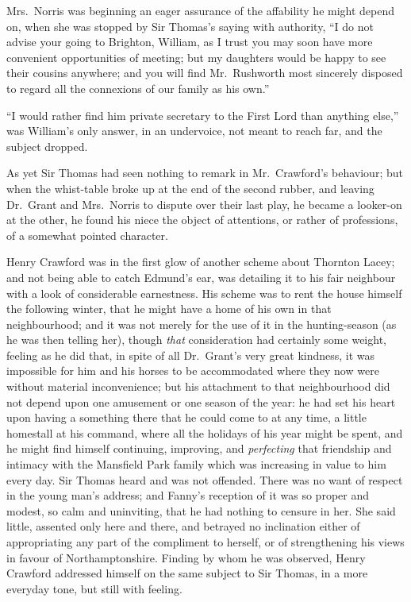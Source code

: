 \documentclass{article}
\begin{document}
Mrs.\ Norris was beginning an eager assurance of the
affability he might depend on, when she was stopped
by Sir Thomas's saying with authority, ``I do not advise
your going to Brighton, William, as I trust you may soon
have more convenient opportunities of meeting; but my
daughters would be happy to see their cousins anywhere;
and you will find Mr.\ Rushworth most sincerely disposed
to regard all the connexions of our family as his own.''

``I would rather find him private secretary to the First
Lord than anything else,'' was William's only answer,
in an undervoice, not meant to reach far, and the
subject dropped.

As yet Sir Thomas had seen nothing to remark in Mr.\ Crawford's
behaviour; but when the whist-table broke up at the end
of the second rubber, and leaving Dr.\ Grant and Mrs.\ Norris
to dispute over their last play, he became a looker-on
at the other, he found his niece the object of attentions,
or rather of professions, of a somewhat pointed character.

Henry Crawford was in the first glow of another scheme
about Thornton Lacey; and not being able to catch
Edmund's ear, was detailing it to his fair neighbour
with a look of considerable earnestness.  His scheme
was to rent the house himself the following winter,
that he might have a home of his own in that neighbourhood;
and it was not merely for the use of it in the hunting-season
(as he was then telling her), though \emph{that} consideration
had certainly some weight, feeling as he did that,
in spite of all Dr.\ Grant's very great kindness, it was
impossible for him and his horses to be accommodated
where they now were without material inconvenience;
but his attachment to that neighbourhood did not depend
upon one amusement or one season of the year:  he had set
his heart upon having a something there that he could
come to at any time, a little homestall at his command,
where all the holidays of his year might be spent, and he
might find himself continuing, improving, and \emph{perfecting}
that friendship and intimacy with the Mansfield Park
family which was increasing in value to him every day.
Sir Thomas heard and was not offended.  There was no want
of respect in the young man's address; and Fanny's reception
of it was so proper and modest, so calm and uninviting,
that he had nothing to censure in her.  She said little,
assented only here and there, and betrayed no inclination
either of appropriating any part of the compliment to herself,
or of strengthening his views in favour of Northamptonshire.
Finding by whom he was observed, Henry Crawford addressed
himself on the same subject to Sir Thomas, in a more
everyday tone, but still with feeling.
\end{document}
